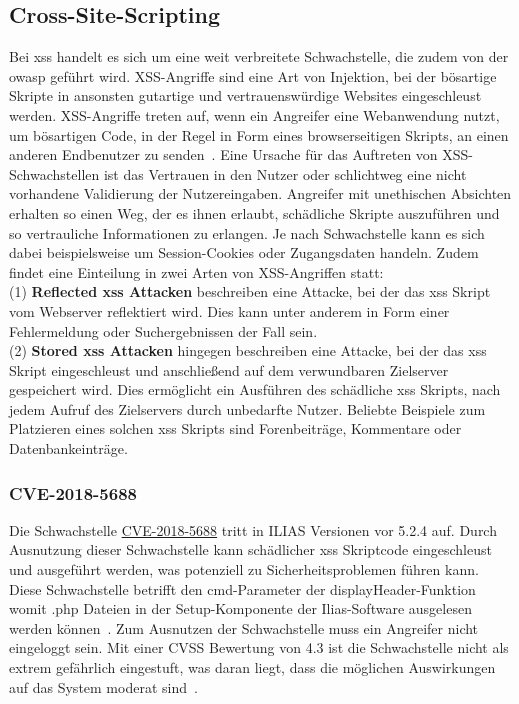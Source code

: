 \documentclass[10pt, a4paper,onecolumn ,titlepage]{article}
\begin{document}
    \subsection{Cross-Site-Scripting}
    \label{subsec:CrossSiteScripting}
    Bei \ac{xss} handelt es sich um eine weit verbreitete Schwachstelle, die zudem von der \ac{owasp} geführt wird.
    XSS-Angriffe sind eine Art von Injektion, bei der bösartige Skripte in ansonsten gutartige und vertrauenswürdige Websites eingeschleust werden.
    XSS-Angriffe treten auf, wenn ein Angreifer eine Webanwendung nutzt, um bösartigen Code, in der Regel in Form eines browserseitigen Skripts, an einen anderen Endbenutzer zu senden~\parencite{xss}.
    Eine Ursache für das Auftreten von XSS-Schwachstellen ist das Vertrauen in den Nutzer oder schlichtweg eine nicht vorhandene Validierung der Nutzereingaben.
    Angreifer mit unethischen Absichten erhalten so einen Weg, der es ihnen erlaubt, schädliche Skripte auszuführen und so vertrauliche Informationen zu erlangen.
    Je nach Schwachstelle kann es sich dabei beispielsweise um Session-Cookies oder Zugangsdaten handeln.
    Zudem findet eine Einteilung in zwei Arten von XSS-Angriffen statt:
    \\
    (1) \textbf{Reflected \ac{xss} Attacken} beschreiben eine Attacke, bei der das \ac{xss} Skript vom Webserver reflektiert wird.
    Dies kann unter anderem in Form einer Fehlermeldung oder Suchergebnissen der Fall sein.
    \\
    (2) \textbf{Stored \ac{xss} Attacken} hingegen beschreiben eine Attacke, bei der das \ac{xss} Skript eingeschleust und anschließend auf dem verwundbaren Zielserver gespeichert wird.
    Dies ermöglicht ein Ausführen des schädliche \ac{xss} Skripts, nach jedem Aufruf des Zielservers durch unbedarfte Nutzer.
    Beliebte Beispiele zum Platzieren eines solchen \ac{xss} Skripts sind Forenbeiträge, Kommentare oder Datenbankeinträge.


    \subsubsection{CVE-2018-5688}
    \label{subsubsec:CVE-2018-5688}
    Die Schwachstelle \href{https://www.cve.org/CVERecord?id=CVE-2018-5688}{CVE-2018-5688} tritt in ILIAS Versionen vor 5.2.4 auf.
    Durch Ausnutzung dieser Schwachstelle kann schädlicher \ac{xss} Skriptcode eingeschleust und ausgeführt werden, was potenziell zu Sicherheitsproblemen führen kann.
    Diese Schwachstelle betrifft den cmd-Parameter der displayHeader-Funktion womit .php Dateien in der Setup-Komponente der Ilias-Software ausgelesen werden können~\parencite{xssExploitDb}.
    Zum Ausnutzen der Schwachstelle muss ein Angreifer nicht eingeloggt sein.
    Mit einer CVSS Bewertung von 4.3 ist die Schwachstelle nicht als extrem gefährlich eingestuft, was daran liegt, dass die möglichen Auswirkungen auf das System moderat sind~\parencite{xssCVEDetails}.
\end{document}
